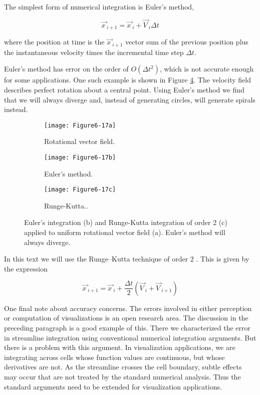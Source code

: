 The simplest form of numerical integration is Euler's method,

\begin{equation}\label{eq:6.3}
\overrightarrow{x\ }_{i+1} = \overrightarrow{x\ }_i + \overrightarrow{V\ }_i \Delta{t}
\end{equation}

where the position at time is the $\overrightarrow{x\ }_{i+1}$ vector sum of the previous position plus the instantaneous velocity times the incremental time step $\Delta{t}$.

Euler's method has error on the order of $O(\Delta{t}^2)$, which is not accurate enough for some applications. One such example is shown in Figure \ref{fig:Figure6-17}. The velocity field describes perfect rotation about a central point. Using Euler's method we find that we will always diverge and, instead of generating circles, will generate spirals instead.

\begin{figure}[htb]
	\begin{subfigure}[h]{0.32\linewidth}
		\texttt{[image: Figure6-17a]}
		\caption{Rotational vector field.}\label{fig:Figure6-17a}
	\end{subfigure}
	\hfill
	\begin{subfigure}[h]{0.32\linewidth}
	\texttt{[image: Figure6-17b]}
	\caption{Euler's method.}\label{fig:Figure6-17b}
	\end{subfigure}
	\hfill
	\begin{subfigure}[h]{0.32\linewidth}
	\texttt{[image: Figure6-17c]}
	\caption{Runge-Kutta..}\label{fig:Figure6-17c}
\end{subfigure}
	\caption{Euler's integration (b) and Runge-Kutta integration of order 2 (c) applied to uniform rotational vector field (a). Euler's method will always diverge.}\label{fig:Figure6-17}
\end{figure}

In this text we will use the Runge--Kutta technique of order $2$ \cite{Conte72}. This is given by the expression

\begin{equation}\label{eq:6.4}
\overrightarrow{x\ }_{i+1} = \overrightarrow{x\ }_i +\frac{\Delta t}{2}(\overrightarrow{V\ }_i + \overrightarrow{V\ }_{i+1})
\end{equation}

One final note about accuracy concerns. The errors involved in either perception or computation of visualizations is an open research area. The discussion in the preceding paragraph is a good example of this. There we characterized the error in streamline integration using conventional numerical integration arguments. But there is a problem with this argument. In visualization applications, we are integrating across cells whose function values are continuous, but whose derivatives are not. As the streamline crosses the cell boundary, subtle effects may occur that are not treated by the standard numerical analysis. Thus the standard arguments need to be extended for visualization applications.

